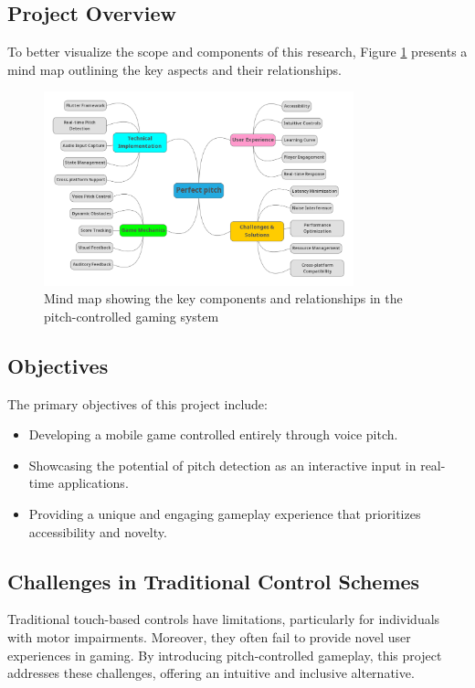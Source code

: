 \documentclass[runningheads]{llncs}
\begin{document}
\newpage
\subsection{Project Overview}
To better visualize the scope and components of this research, Figure \ref{fig:mindmap} presents a mind map outlining the key aspects and their relationships.

\begin{figure}[h]
    \centering
    \includegraphics[width=0.8\textwidth]{figures/mindmap.png}
    \caption{Mind map showing the key components and relationships in the pitch-controlled gaming system}
    \label{fig:mindmap}
\end{figure}

\subsection{Objectives}
The primary objectives of this project include:
\begin{itemize}
    \item Developing a mobile game controlled entirely through voice pitch.
    \item Showcasing the potential of pitch detection as an interactive input in real-time applications.
    \item Providing a unique and engaging gameplay experience that prioritizes accessibility and novelty.
\end{itemize}

\subsection{Challenges in Traditional Control Schemes}
Traditional touch-based controls have limitations, particularly for individuals with motor impairments. Moreover, they often fail to provide novel user experiences in gaming. By introducing pitch-controlled gameplay, this project addresses these challenges, offering an intuitive and inclusive alternative.
\end{document}
